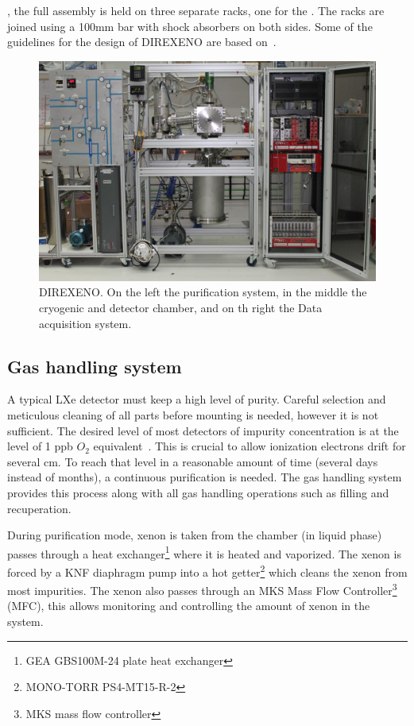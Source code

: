 , the full assembly is held on three separate racks, 
one for the . The racks are joined using a 100mm bar with shock 
absorbers on both sides. Some of the guidelines for the design of DIREXENO are based 
on~\cite{Giboni}.  

\begin{figure}[h]
\centerline{\includegraphics[width=0.8\linewidth]{FullDet.jpg}}
\caption{DIREXENO. On the left the purification system, in the middle the cryogenic and detector 
chamber, and on th right the Data acquisition system.}
\label{fig:fulldet}
\end{figure}

\subsection{Gas handling system}
\label{subsec:gas}

A typical LXe detector must keep a high level of purity. Careful selection and 
meticulous cleaning of all parts before mounting is needed, however it is not sufficient. 
The desired level of most detectors of impurity concentration is at the level of 1 ppb $O_2$ 
equivalent~\cite{Aprile:2009dv}. This is crucial to allow ionization electrons drift for several 
cm. To reach that level in a reasonable amount of time (several days instead of months), 
a continuous purification is needed. The gas handling system provides this process 
along with all gas handling operations such as filling and recuperation.

During purification mode, xenon is taken from the chamber (in liquid phase)
passes through a heat exchanger\footnote{GEA GBS100M-24 plate heat exchanger} 
where it is heated and vaporized. The xenon is forced 
by a KNF diaphragm pump into a hot getter\footnote{MONO-TORR
PS4-MT15-R-2} which cleans the xenon from most impurities. The xenon
also passes through an MKS Mass Flow Controller\footnote{MKS mass flow controller} (MFC), 
this allows monitoring and controlling the amount of xenon in the system. 

